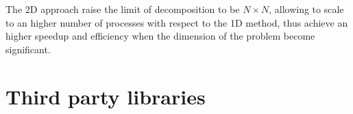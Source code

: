 The 2D approach raise the limit of decomposition to be $N\times N$, allowing to scale to an higher number of processes with respect to the 1D method, thus achieve an higher speedup and efficiency when the dimension of the problem become significant.




\section{Third party libraries}

